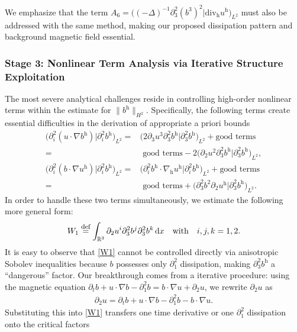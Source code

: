 \documentclass[11pt]{amsart}
\theoremstyle{definition}
\newcommand{\R}{\mathbb{R}}
\newcommand{\h}{\mathrm{h}}
\def\eqdefa{\buildrel\hbox{\footnotesize def}\over =}
\newcommand{\dx}{\,{\rm d}x}
\numberwithin{equation}{section}
\begin{document}
We emphasize that the term $A_6=\big((-\Delta)^{-1}\partial_3^2(b^3)^2 | \mathrm{div}_\mathrm{h} u^\mathrm{h}\big)_{L^2}$ must also be addressed with the same method, making our proposed dissipation pattern and background magnetic field essential.



\subsubsection{Stage 3: Nonlinear Term Analysis via Iterative Structure Exploitation}

The most severe analytical challenges reside in controlling high-order nonlinear terms within the estimate for $\|b^\mathrm{h}\|_{H^2}$. Specifically, the following terms create essential difficulties in the derivation of appropriate a priori bounds
\begin{align*}
	\Big(\partial_i^2(u\cdot\nabla b^\h)|\partial_i^2 b^\h\Big)_{L^2}=&\Big(2\partial_{3}u^{3} \partial_{3}^2b^\h|\partial_{3}^2b^\h\Big)_{L^2}+ \text{good terms}\\
	=& \text{ good terms}-2\Big(\partial_{2}u^{2} \partial_{3}^2b^\h|\partial_{3}^2b^\h\Big)_{L^2},\\
	\Big(\partial_i^2(b\cdot\nabla u^\h)|\partial_i^2 b^\h\Big)_{L^2}=&\Big(\partial_{i}^2b^{\mathrm{h}}\cdot\nabla_{\mathrm{h}} u^\h|\partial_{i}^2b^\h\Big)_{L^2}+\text{good terms}\\
	=& \text{ good terms}+\Big(\partial_{3}^2b^2\partial_2u^\h|\partial_{3}^2b^\h\Big)_{L^2}.
\end{align*}
In order to handle these two terms simultaneously, we estimate the following more general form:
\begin{align}\label{W1}
	W_1 \eqdefa \int_{\R^3} \partial_2 u^i  \partial_3^2 b^j \partial_3^2 b^k \dx \quad \mathrm{with}\quad i,j,k=1,2.
\end{align}
It is easy to observe that \eqref{W1} cannot be controlled directly via anisotropic Sobolev inequalities because $b$ possesses only $\partial_1^2$ dissipation, making $\partial_3^2 b^\mathrm{h}$ a ``dangerous'' factor. Our breakthrough comes from a iterative procedure: using the magnetic equation $ \partial_t b + u\cdot\nabla b - \partial_1^2 b = b\cdot\nabla u + \partial_2 u$, we rewrite $\partial_2 u$ as
\begin{align}\label{ha}
	\partial_2 u = \partial_t b + u\cdot\nabla b - \partial_1^2 b - b\cdot\nabla u.
\end{align}
Substituting this into \eqref{W1} transfers one time derivative or one $\partial_1^2$ dissipation onto the critical factors
\end{document}

